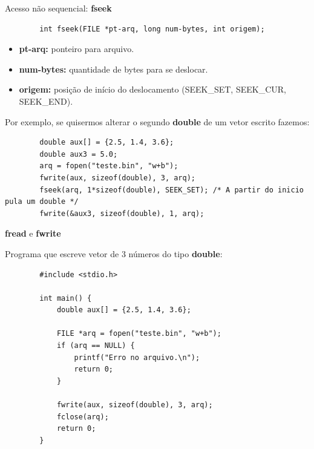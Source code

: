 \documentclass[handout]{beamer}
\begin{document}
\begin{frame}[fragile]{Acesso não sequencial: \textbf{fseek}}
    \begin{verbatim}
        int fseek(FILE *pt-arq, long num-bytes, int origem);
    \end{verbatim}
    \vspace{-1em}
    \begin{itemize}
        \item \textbf{pt-arq:} ponteiro para arquivo.
        \item \textbf{num-bytes:} quantidade de bytes para se deslocar.
        \item \textbf{origem:} posição de início do deslocamento (SEEK\_SET, SEEK\_CUR, SEEK\_END).
    \end{itemize}
    Por exemplo, se quisermos alterar o segundo \textbf{double} de um vetor escrito fazemos:
    \vspace{-1em}
    \begin{verbatim}
        double aux[] = {2.5, 1.4, 3.6};
        double aux3 = 5.0;
        arq = fopen("teste.bin", "w+b");
        fwrite(aux, sizeof(double), 3, arq);
        fseek(arq, 1*sizeof(double), SEEK_SET); /* A partir do inicio pula um double */
        fwrite(&aux3, sizeof(double), 1, arq);
    \end{verbatim}

\end{frame}

\begin{frame}[fragile]{\textbf{fread} e \textbf{fwrite}}

    Programa que escreve vetor de 3 números do tipo \textbf{double}:
    \begin{verbatim}
        #include <stdio.h>

        int main() {
            double aux[] = {2.5, 1.4, 3.6};

            FILE *arq = fopen("teste.bin", "w+b");
            if (arq == NULL) {
                printf("Erro no arquivo.\n");
                return 0;
            }

            fwrite(aux, sizeof(double), 3, arq);
            fclose(arq);
            return 0;
        }
    \end{verbatim}

\end{frame}
\end{document}
